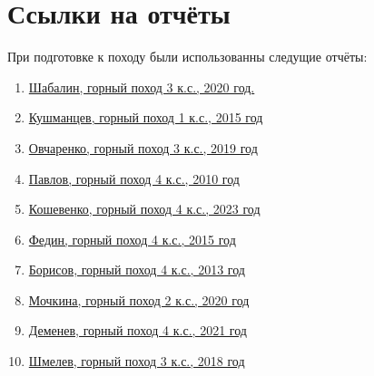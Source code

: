 \section{Ссылки на отчёты}\label{sec:referenses}
    При подготовке к походу были использованны следущие отчёты:
    
    \begin{enumerate}
        \item \href{https://www.geolink-group.com/tourclub/trips/2020ms3/}{Шабалин, горный поход 3 к.с., 2020 год.}
        \item \href{https://stksplav.narod.ru/reports/2015/Kushmantchev_Digoriya-2015.pdf}{Кушманцев, горный поход 1 к.с., 2015 год}
        \item \href{https://www.tlib.ru/doc.aspx?id=41849&page=1}{Овчаренко, горный поход 3 к.с., 2019 год}
        \item \href{https://www.tlib.ru/doc.aspx?id=42012&page=1}{Павлов, горный поход 4 к.с., 2010 год}
        \item \href{https://disk.yandex.ru/i/q_hmH7NqC-Du_A}{Кошевенко, горный поход 4 к.с., 2023 год}
        \item \href{www.mountain.ru/article/mainarticle.php?article_id=8277}{Федин, горный поход 4 к.с., 2015 год}
        \item \href{https://stksplav.narod.ru/reports/2013/Otchet_Elbrus-2013-4.pdf}{Борисов, горный поход 4 к.с., 2013 год}
        \item \href{https://www.tlib.ru/doc.aspx?id=42168&page=1}{Мочкина, горный поход 2 к.с., 2020 год}
        \item \href{meridian.perm.ru/03_reports/kavkaz2021_4/Kavkaz2021_4.shtml}{Деменев, горный поход 4 к.с., 2021 год}
        \item \href{www.mountain.ru/article/mainarticle.php?article_id=8998}{Шмелев, горный поход 3 к.с., 2018 год}
    \end{enumerate}
